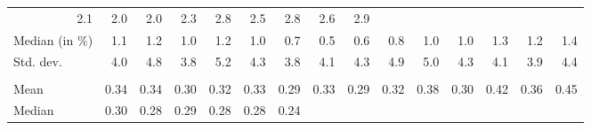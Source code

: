 \begin{tabular}{lllllllllllllll}
  \multicolumn{1}{r}{2.1} &
  \multicolumn{1}{r}{2.0} &
  \multicolumn{1}{r}{2.0} &
  \multicolumn{1}{r}{2.3} &
  \multicolumn{1}{r}{2.8} &
  \multicolumn{1}{r}{2.5} &
  \multicolumn{1}{r}{2.8} &
  \multicolumn{1}{r}{2.6} &
  \multicolumn{1}{r}{2.9} \\
\multicolumn{1}{l}{\hspace{2em}Median (in $\%$)} &
  \multicolumn{1}{|r}{1.1} &
  \multicolumn{1}{r}{1.2} &
  \multicolumn{1}{r}{1.0} &
  \multicolumn{1}{r}{1.2} &
  \multicolumn{1}{r}{1.0} &
  \multicolumn{1}{r}{0.7} &
  \multicolumn{1}{r}{0.5} &
  \multicolumn{1}{r}{0.6} &
  \multicolumn{1}{r}{0.8} &
  \multicolumn{1}{r}{1.0} &
  \multicolumn{1}{r}{1.0} &
  \multicolumn{1}{r}{1.3} &
  \multicolumn{1}{r}{1.2} &
  \multicolumn{1}{r}{1.4} \\
\multicolumn{1}{l}{\hspace{2em}Std. dev.} &
  \multicolumn{1}{|r}{4.0} &
  \multicolumn{1}{r}{4.8} &
  \multicolumn{1}{r}{3.8} &
  \multicolumn{1}{r}{5.2} &
  \multicolumn{1}{r}{4.3} &
  \multicolumn{1}{r}{3.8} &
  \multicolumn{1}{r}{4.1} &
  \multicolumn{1}{r}{4.3} &
  \multicolumn{1}{r}{4.9} &
  \multicolumn{1}{r}{5.0} &
  \multicolumn{1}{r}{4.3} &
  \multicolumn{1}{r}{4.1} &
  \multicolumn{1}{r}{3.9} &
  \multicolumn{1}{r}{4.4} \\
\multicolumn{1}{l}{\hspace{1em}{\textit{Elasticity} ($\widehat{\beta}$)}} &
  \multicolumn{1}{|r}{} &
  \multicolumn{1}{r}{} &
  \multicolumn{1}{r}{} &
  \multicolumn{1}{r}{} &
  \multicolumn{1}{r}{} &
  \multicolumn{1}{r}{} &
  \multicolumn{1}{r}{} &
  \multicolumn{1}{r}{} &
  \multicolumn{1}{r}{} &
  \multicolumn{1}{r}{} &
  \multicolumn{1}{r}{} &
  \multicolumn{1}{r}{} &
  \multicolumn{1}{r}{} &
  \multicolumn{1}{r}{} \\
\multicolumn{1}{l}{\hspace{2em}Mean} &
  \multicolumn{1}{|r}{0.34} &
  \multicolumn{1}{r}{0.34} &
  \multicolumn{1}{r}{0.30} &
  \multicolumn{1}{r}{0.32} &
  \multicolumn{1}{r}{0.33} &
  \multicolumn{1}{r}{0.29} &
  \multicolumn{1}{r}{0.33} &
  \multicolumn{1}{r}{0.29} &
  \multicolumn{1}{r}{0.32} &
  \multicolumn{1}{r}{0.38} &
  \multicolumn{1}{r}{0.30} &
  \multicolumn{1}{r}{0.42} &
  \multicolumn{1}{r}{0.36} &
  \multicolumn{1}{r}{0.45} \\
\multicolumn{1}{l}{\hspace{2em}Median } &
  \multicolumn{1}{|r}{0.30} &
  \multicolumn{1}{r}{0.28} &
  \multicolumn{1}{r}{0.29} &
  \multicolumn{1}{r}{0.28} &
  \multicolumn{1}{r}{0.28} &
  \multicolumn{1}{r}{0.24} &

\end{tabular}
